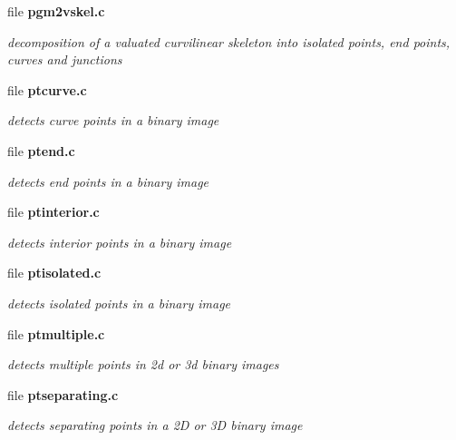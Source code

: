 \begin{CompactItemize}
\item 
file {\bf pgm2vskel.c}
\begin{CompactList}\small\item\em decomposition of a valuated curvilinear skeleton into isolated points, end points, curves and junctions \item\end{CompactList}

\item 
file {\bf ptcurve.c}
\begin{CompactList}\small\item\em detects curve points in a binary image \item\end{CompactList}

\item 
file {\bf ptend.c}
\begin{CompactList}\small\item\em detects end points in a binary image \item\end{CompactList}

\item 
file {\bf ptinterior.c}
\begin{CompactList}\small\item\em detects interior points in a binary image \item\end{CompactList}

\item 
file {\bf ptisolated.c}
\begin{CompactList}\small\item\em detects isolated points in a binary image \item\end{CompactList}

\item 
file {\bf ptmultiple.c}
\begin{CompactList}\small\item\em detects multiple points in 2d or 3d binary images \item\end{CompactList}

\item 
file {\bf ptseparating.c}
\begin{CompactList}\small\item\em detects separating points in a 2D or 3D binary image \item\end{CompactList}


\end{CompactItemize}

